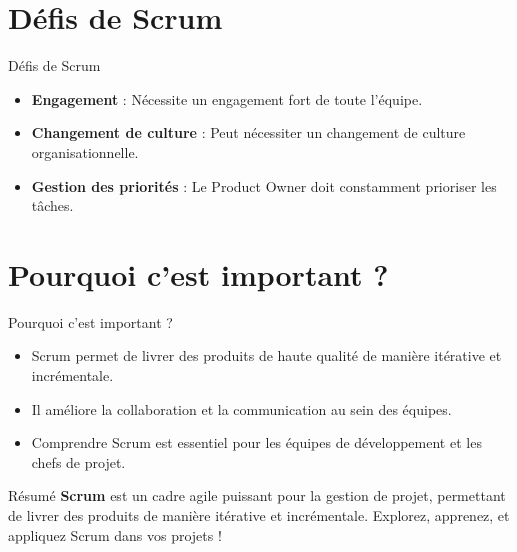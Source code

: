 \documentclass{clbeamer2024}
\begin{document}
	\section{Défis de Scrum}
	\begin{frame}{Défis de Scrum}
		\begin{itemize}
			\item \textbf{Engagement} : Nécessite un engagement fort de toute l'équipe.
			\item \textbf{Changement de culture} : Peut nécessiter un changement de culture organisationnelle.
			\item \textbf{Gestion des priorités} : Le Product Owner doit constamment prioriser les tâches.
		\end{itemize}
	\end{frame}	
	
	
	\section{Pourquoi c'est important ?}
	\begin{frame}{Pourquoi c'est important ?}
		\begin{itemize}
			\item Scrum permet de livrer des produits de haute qualité de manière itérative et incrémentale.
			\item Il améliore la collaboration et la communication au sein des équipes.
			\item Comprendre Scrum est essentiel pour les équipes de développement et les chefs de projet.
		\end{itemize}
	\end{frame}
	
	
	\begin{frame}{Résumé}
		\textbf{Scrum} est un cadre agile puissant pour la gestion de projet, permettant de livrer des produits de manière itérative et incrémentale.  
		Explorez, apprenez, et appliquez Scrum dans vos projets !
	\end{frame}
	
	
	

	

	
\end{document}
